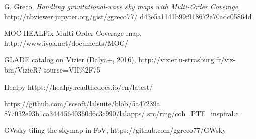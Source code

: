\documentclass[aps, prd, twocolumn, superscriptaddress, nofootinbib]{revtex4-1}
\begin{document}
\begin{thebibliography}{10}
 G. Greco, {\it Handling gravitational-wave sky maps with Multi-Order Coverage}, 
 http://nbviewer.jupyter.org/gist/ggreco77/
 d43e5a1141b99f918672e70adc05864d
 
 MOC-HEALPix Multi-Order Coverage map, http://www.ivoa.net/documents/MOC/
 
 GLADE catalog on Vizier (Dalya+, 2016), http://vizier.u-strasburg.fr/viz-bin/VizieR?-source=VII\%2F75
 
 Healpy https://healpy.readthedocs.io/en/latest/
 
 https://github.com/lscsoft/lalsuite/blob/5a47239a
 877032e93b1ca34445640360d6c3c990/lalapps/
src/ring/coh\_PTF\_inspiral.c

GWsky-tiling the skymap in FoV, https://github.com/ggreco77/GWsky
 
 
\end{thebibliography}
\end{document}
